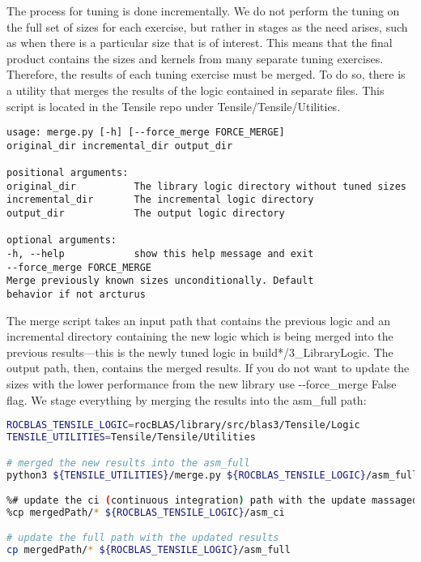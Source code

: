 \documentclass[]{article}
\begin{document}
\noindent
The process for tuning is done incrementally. We do not perform the tuning on the full set of sizes for each exercise, but rather in stages as the need arises, such as when there is a particular size that is of interest. This means that the final product contains the sizes and kernels from many separate tuning exercises. Therefore, the results of each tuning exercise must be merged. To do so, there is a utility that merges the results of the logic contained in separate files. This script is located in the Tensile repo under Tensile/Tensile/Utilities.

\begin{lstlisting}
usage: merge.py [-h] [--force_merge FORCE_MERGE]
original_dir incremental_dir output_dir

positional arguments:
original_dir          The library logic directory without tuned sizes
incremental_dir       The incremental logic directory
output_dir            The output logic directory

optional arguments:
-h, --help            show this help message and exit
--force_merge FORCE_MERGE
Merge previously known sizes unconditionally. Default
behavior if not arcturus
\end{lstlisting}

The merge script takes an input path that contains the previous logic and an incremental directory containing the new logic which is being merged into the previous results---this is the newly tuned logic in build*/3\_LibraryLogic. The output path, then, contains the merged results. If you do not want to update the sizes with the lower performance from the new library use -{}-force\_merge False flag. We stage everything by merging the results into the asm\_full path:

\begin{lstlisting}[language=bash,breaklines=true,commentstyle=\color{ForestGreen}]
ROCBLAS_TENSILE_LOGIC=rocBLAS/library/src/blas3/Tensile/Logic
TENSILE_UTILITIES=Tensile/Tensile/Utilities

# merged the new results into the asm_full
python3 ${TENSILE_UTILITIES}/merge.py ${ROCBLAS_TENSILE_LOGIC}/asm_full newLogicPath mergedPath

%# update the ci (continuous integration) path with the update massaged results
%cp mergedPath/* ${ROCBLAS_TENSILE_LOGIC}/asm_ci

# update the full path with the updated results
cp mergedPath/* ${ROCBLAS_TENSILE_LOGIC}/asm_full
\end{lstlisting}
\end{document}
